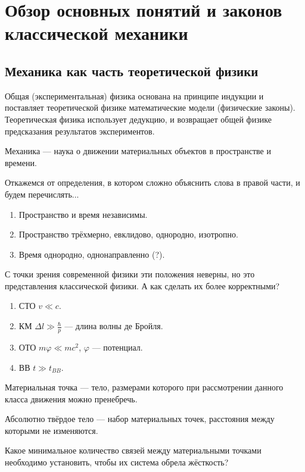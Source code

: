 \documentclass[12pt, a4paper]{article}
\begin{document}
\section{Обзор основных понятий и законов классической механики}
\subsection{Механика как часть теоретической физики}
Общая (экспериментальная) физика основана на принципе индукции и поставляет теоретической физике математические модели (физические законы). Теоретическая физика использует дедукцию, и возвращает общей физике предсказания результатов экспериментов.

\begin{dfn} Механика --- наука о движении материальных объектов в пространстве и времени. \end{dfn}
Откажемся от определения, в котором сложно объяснить слова в правой части, и будем перечислять...
\begin{enumerate}
\item Пространство и время независимы.
\item Пространство трёхмерно, евклидово, однородно, изотропно.
\item Время однородно, однонаправленно (?).
\end{enumerate}
С точки зрения современной физики эти положения неверны, но это представления классической физики. А как сделать их более корректными?
\begin{enumerate}
\item СТО $v \ll c$.
\item КМ $\Delta l \gg \frac{\hbar}{p}$ --- длина волны де Бройля.
\item ОТО $m \varphi \ll mc^2$, $\varphi$ --- потенциал.
\item ВВ $t \gg t_{BB}$.
\end{enumerate}

\begin{dfn}
Материальная точка --- тело, размерами которого при рассмотрении данного класса движения можно пренебречь.
\end{dfn}
\begin{dfn}
Абсолютно твёрдое тело --- набор материальных точек, расстояния между которыми не изменяются.
\end{dfn}

\begin{task} Какое минимальное количество связей между материальными точками необходимо установить, чтобы их система обрела жёсткость? \end{task}
\end{document}
